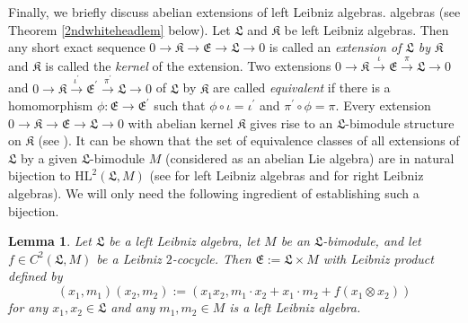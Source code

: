 \documentclass{amsart}
\newtheorem{lem}[thm]{Lemma}
\numberwithin{equation}{section}
\newcommand{\HL}{\mathrm{HL}}
\newcommand{\lf}{\mathfrak{L}}
\newcommand{\kf}{\mathfrak{K}}
\newcommand{\ef}{\mathfrak{E}}
\begin{document}
Finally, we briefly discuss abelian extensions of left Leibniz algebras.
algebras (see Theorem \ref{2ndwhiteheadlem} below).
Let $\lf$ and $\kf$ be left Leibniz algebras. Then any short exact sequence $0\to\kf\to\ef\to
\lf\to 0$ is called an {\em extension of $\lf$ by $\kf$\/} and $\kf$ is called the {\em kernel\/}
of the extension. Two extensions $0\to\kf\stackrel{\iota}\to\ef\stackrel{\pi}\to\lf\to 0$ and
$0\to\kf\stackrel{\iota^\prime}\to\ef^\prime\stackrel{\pi^\prime}\to\lf\to 0$ of $\lf$ by $\kf$
are called {\em equivalent\/} if there is a homomorphism $\phi:\ef\to\ef^\prime$ such that
$\phi\circ\iota=\iota^\prime$ and $\pi^\prime\circ\phi=\pi$. Every extension $0\to\kf\to\ef
\to\lf\to 0$ with abelian kernel $\kf$ gives rise to an $\lf$-bimodule structure on $\kf$ (see
\cite[Proposition 1.3.6]{Co}). It can be shown that the set of equivalence classes of all
extensions of $\lf$ by a given $\lf$-bimodule $M$ (considered as an abelian Lie algebra) are
in natural bijection to $\HL^2(\lf,M)$ (see \cite[Theorem 1.3.13]{Co} for left Leibniz algebras
and \cite[Proposition 1.9]{LP1} for right Leibniz algebras). We will only need the following
ingredient of establishing such a bijection.

\begin{lem}\label{ext}
Let $\lf$ be a left Leibniz algebra, let $M$ be an $\lf$-bimodule, and let $f\in C^2(\lf,M)$ be
a Leibniz $2$-cocycle. Then $\ef:=\lf\times M$ with Leibniz product defined by $$(x_1,m_1)
(x_2,m_2):=(x_1x_2,m_1\cdot x_2+x_1\cdot m_2+f(x_1\otimes x_2))$$ for any $x_1,x_2\in
\lf$ and any $m_1,m_2\in M$ is a left Leibniz algebra.
\end{lem}
\end{document}
